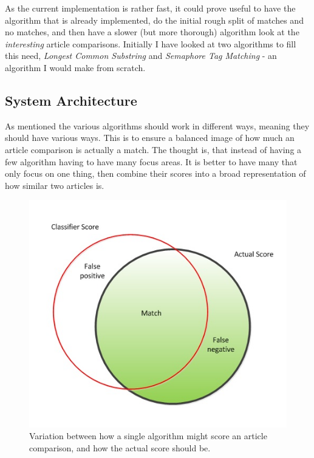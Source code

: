 As the current implementation is rather fast, it could prove useful to have the algorithm that is already implemented, do the initial rough split of matches and no matches, and then have a slower (but more thorough) algorithm look at the \textit{interesting} article comparisons. Initially I have looked at two algorithms to fill this need, \textit{Longest Common Substring} and \textit{Semaphore Tag Matching} - an algorithm I would make from scratch.

\subsection{System Architecture}
As mentioned the various algorithms should work in different ways, meaning they should have various ways. This is to ensure a balanced image of how much an article comparison is actually a match. The thought is, that instead of having a few algorithm having to have many focus areas. It is better to have many that only focus on one thing, then combine their scores into a broad representation of how similar two articles is.

\pagebreak

\begin{figure}
	\centering
	\includegraphics[scale=0.5]{figures/SingleAlgoScore}
	\caption{Variation between how a single algorithm might score an article comparison, and how the actual score should be\cite{Slides}.}
\end{figure}

